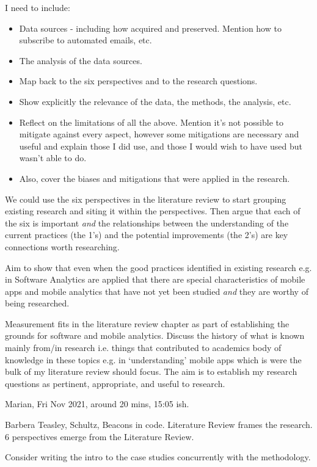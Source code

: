 I need to include: 
\begin{itemize}
    \item Data sources - including how acquired and preserved. Mention how to subscribe to automated emails, etc.
    \item The analysis of the data sources.
    \item Map back to the six perspectives and to the research questions.
    \item Show explicitly the relevance of the data, the methods, the analysis, etc.
    \item Reflect on the limitations of all the above. Mention it's not possible to mitigate against every aspect, however some mitigations are necessary and useful and explain those I did use, and those I would wish to have used but wasn't able to do.
    \item Also, cover the biases and mitigations that were applied in the research.
\end{itemize}

We could use the six perspectives in the literature review to start grouping existing research and siting it within the perspectives. Then argue that each of the six is important \textit{and} the relationships between the understanding of the current practices (the 1's) and the potential improvements (the 2's) are key connections worth researching.

Aim to show that even when the good practices identified in existing research e.g. in Software Analytics are applied that there are special characteristics of mobile apps and mobile analytics that have not yet been studied \textit{and} they are worthy of being researched.

Measurement fits in the literature review chapter as part of establishing the grounds for software and mobile analytics. Discuss the history of what is known mainly from/in research i.e. things that contributed to academics body of knowledge in these topics e.g. in `understanding' mobile apps which is were the bulk of my literature review should focus. The aim is to establish my research questions as pertinent, appropriate, and useful to research.

\dotfill

Marian, Fri  Nov 2021, around 20 mins, 15:05 ish.

Barbera Teasley, Schultz, Beacons in code. 
Literature Review frames the research. 6 perspectives emerge from the Literature Review.


Consider writing the intro to the case studies concurrently with the methodology.

